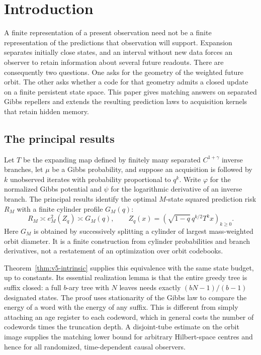 \section{Introduction}\label{sec:v5-intro}
A finite representation of a present observation need not be a finite
representation of the predictions that observation will support.
Expansion separates initially close states, and an interval without
new data forces an observer to retain information about several
future readouts. There are consequently two questions. One asks for
the geometry of the weighted future orbit. The other asks whether a
code for that geometry admits a closed update on a finite persistent
state space. This paper gives matching answers on separated Gibbs
repellers and extends the resulting prediction laws to acquisition
kernels that retain hidden memory.

\subsection{The principal results}
Let $T$ be the expanding map defined by finitely many separated
$C^{1+\gamma}$ inverse branches, let $\mu$ be a Gibbs probability,
and suppose an acquisition is followed by $k$ unobserved iterates
with probability proportional to $q^k$. Write $\varphi$ for the
normalized Gibbs potential and $\psi$ for the logarithmic derivative
of an inverse branch. The principal results identify the optimal
$M$-state squared prediction risk $R_M$ with a finite cylinder
profile $G_M(q)$:
\[
 R_M\asymp e_M^2(Z_q)\asymp G_M(q),\qquad
 Z_q(x)=(\sqrt{1-q}\,q^{k/2}T^kx)_{k\ge0}.
\]
Here $G_M$ is obtained by successively splitting a cylinder of
largest mass-weighted orbit diameter. It is a finite construction
from cylinder probabilities and branch derivatives, not a restatement
of an optimization over orbit codebooks.

Theorem~\ref{thm:v5-intrinsic} supplies this equivalence with the
same state budget, up to constants. Its essential realization lemma
is that the entire greedy tree is suffix closed: a full $b$-ary
tree with $N$ leaves needs exactly $(bN-1)/(b-1)$ designated
states. The proof uses stationarity of the Gibbs law to compare the
energy of a word with the energy of any suffix. This is different
from simply attaching an age register to each codeword, which in
general costs the number of codewords times the truncation depth.
A disjoint-tube estimate on the orbit image supplies the matching
lower bound for arbitrary Hilbert-space centres and hence for all
randomized, time-dependent causal observers.

